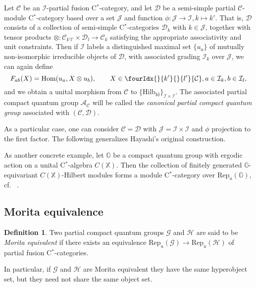 \documentclass[10pt]{article}
\DeclareMathOperator{\fin}{\mathrm{fd}}
\DeclareMathOperator{\Hom}{Hom}
\newcommand{\G}{\mathbb{G}}
\newcommand{\CatC}{\mathcal{C}}
\newcommand{\CatD}{\mathcal{D}}
\newcommand{\CatCC}{\mathscr{C}}
\newcommand{\CatDD}{\mathscr{D}}
\newcommand{\Hilb}{\mathrm{Hilb}}
\newcommand{\Rep}{\mathrm{Rep}}
\newcommand{\Gr}[5]{\fourIdx{#2}{#4}{#3}{#5}{#1}}%
\newcommand{\Gru}[3]{\Gr{#1}{}{}{#2}{#3}}
\theoremstyle{definition}
\newtheorem{Def}[Theorem]{Definition}
\numberwithin{equation}{section}
\begin{document}
Let $\CatCC$ be an $\mathscr{I}$-partial fusion C$^*$-category, and let $\CatDD$ be a semi-simple partial $\CatCC$-module C$^*$-category based over a set $\mathscr{J}$ and function $\phi:\mathscr{J}\rightarrow \mathscr{I},k\mapsto k'$. That is, $\CatDD$ consists of a collection of semi-simple C$^*$-categories $\CatD_{k}$ with $k\in \mathscr{J}$, together with tensor products $\otimes: \CatC_{k'l'}\times \CatD_{l}\rightarrow \CatC_{k}$ satisfying the appropriate associativity and unit constraints. Then if $\mathcal{I}$ labels a distinguished maximal set $\{u_a\}$ of mutually non-isomorphic irreducible objects of $\CatD$, with associated grading $\mathcal{I}_{k}$ over $\mathscr{J}$, we can again define \[F_{ab}(X)  = \Hom(u_a,  X\otimes u_b),\qquad X\in \Gru{\CatC}{k'}{l'}, a\in \mathcal{I}_{k},b\in\mathcal{I}_{l},\] and we obtain a unital morphism from $\CatCC$ to $\{\Hilb_{\fin}\}_{\mathcal{I}\times \mathcal{I}}$. The associated partial compact quantum group $\mathscr{A}_{\CatCC}$ will be called the \emph{canonical partial compact quantum group} associated with $(\CatCC,\CatDD)$. 

As a particular case, one can consider $\CatCC= \CatDD$ with $\mathscr{J} = \mathscr{I}\times \mathscr{I}$ and $\phi$ projection to the first factor.
The following generalizes Hayashi's original construction.

As another concrete example, let $\G$ be a compact quantum group with ergodic action on a unital C$^*$-algebra $C(\mathbb{X})$. Then the collection of finitely generated $\G$-equivariant $C(\mathbb{X})$-Hilbert modules forms a module C$^*$-category over $\Rep_u(\G)$, cf.~ \cite{DCY1}. 

\subsection{Morita equivalence}


\begin{Def} Two partial compact quantum groups $\mathscr{G}$ and $\mathscr{H}$ are said to be \emph{Morita equivalent} if there exists an equivalence $\Rep_u(\mathscr{G}) \rightarrow \Rep_u(\mathscr{H})$ of partial fusion C$^*$-categories. 
\end{Def} 

In particular, if $\mathscr{G}$ and $\mathscr{H}$ are Morita equivalent they have the same hyperobject set, but they need not share the same object set.
\end{document}
